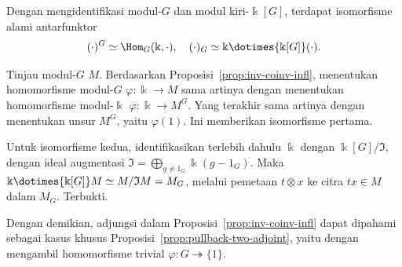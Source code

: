 \begin{proposisi}\label{prop:inv-coinv-Hom}
	Dengan mengidentifikasi modul-$G$ dan modul kiri-$\Bbbk[G]$, terdapat
	isomorfisme alami antarfunktor
	\begin{gather*}
		(\cdot)^G \simeq \Hom_G(\Bbbk, \cdot), \quad  (\cdot)_G \simeq \Bbbk \dotimes{\Bbbk[G]} (\cdot).
	\end{gather*}
\end{proposisi}
\begin{bukti}
	Tinjau modul-$G$ $M$. Berdasarkan Proposisi~\ref{prop:inv-coinv-infl},
	menentukan homomorfisme modul-$G$ $\varphi:\Bbbk\to M$ sama artinya
	dengan menentukan homomorfisme modul-$\Bbbk$ $\varphi:\Bbbk\to M^G$.
	Yang terakhir sama artinya dengan menentukan unsur $M^G$, yaitu
	$\varphi(1)$. Ini memberikan isomorfisme pertama.
	
	Untuk isomorfisme kedua, identifikasikan terlebih dahulu $\Bbbk$ dengan
	$\Bbbk[G]/\mathfrak{I}$, dengan ideal augmentasi
	$\mathfrak{I}=\bigoplus_{g\neq1_G}\Bbbk(g-1_G)$. Maka
	$\Bbbk\dotimes{\Bbbk[G]}M\simeq M/\mathfrak{I}M=M_G$, melalui pemetaan
	$t\otimes x$ ke citra $tx\in M$ dalam $M_G$. Terbukti.
\end{bukti}

Dengan demikian, adjungsi dalam Proposisi~\ref{prop:inv-coinv-infl} dapat
dipahami sebagai kasus khusus Proposisi~\ref{prop:pullback-two-adjoint}, yaitu
dengan mengambil homomorfisme trivial $\varphi:G\twoheadrightarrow\{1\}$.

